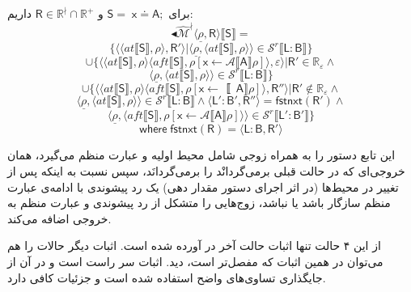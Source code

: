 برای $\mathsf{S=\;x \doteq A;}$ و $\mathsf{R} \in \mathbb{R^\nmid} \cap \mathbb{R^+}$ داریم:
$$\blacktriangleleft\mathcal{\hat{M}^\nmid} \langle \underline{\rho}, \mathsf{R} \rangle \llbracket \mathsf{S} \rrbracket
=$$
$$\{
\langle \langle at \llbracket \mathsf{S} \rrbracket, \rho \rangle , \mathsf{R'} \rangle |
\langle \underline{\rho}, \langle at \llbracket \mathsf{S} \rrbracket, \rho \rangle \rangle \in \mathcal{S}^r \llbracket \mathsf{L:B} \rrbracket \}$$
$$\cup \{ \langle \langle at \llbracket \mathsf{S} \rrbracket , \rho \rangle  \langle aft \llbracket \mathsf{S} \rrbracket, 
\rho [\mathsf{x}\leftarrow \mathcal{A}\llbracket \mathsf{A} \rrbracket \rho ]\rangle , \varepsilon \rangle | \mathsf{R'} \in \mathbb{R_\varepsilon} \land$$
$$
\langle \underline{\rho}, \langle at \llbracket \mathsf{S} \rrbracket , \rho \rangle \rangle \in 
\mathcal{S}^r \llbracket \mathsf{L:B} \rrbracket
\}$$
$$\cup \{
\langle \langle at \llbracket \mathsf{S} \rrbracket , \rho \rangle \langle aft \llbracket \mathsf{S} \rrbracket , \rho [\mathsf{x} \leftarrow \mathcal \llbracket \mathsf{A}\rrbracket \rho]\rangle, \mathsf{R''}\rangle | \mathsf{R'} \notin \mathbb{R_\varepsilon} \land$$
$$\langle \underline{\rho},\langle at \llbracket \mathsf{S} \rrbracket , \rho \rangle \rangle \in \mathcal{S}^r \llbracket \mathsf{L:B} \rrbracket \land \langle \mathsf{L':B',R''} \rangle = 
\mathsf{fstnxt(R') }\land$$
$$\langle \underline{\rho}, \langle aft \llbracket \mathsf{S} \rrbracket,\rho 
[\mathsf{x} \leftarrow \mathcal{A}\llbracket \mathsf{A} \rrbracket \rho]\rangle \rangle \in 
\mathcal{S}^r \llbracket \mathsf{L':B'} \rrbracket
\}$$
$$\mathsf{where \; fstnxt(R)=\langle L:B,R' \rangle}$$

این تابع دستور را به همراه زوجی شامل محیط اولیه و عبارت منظم می‌گیرد، همان خروجی‌ای که در حالت قبلی برمی‌گردانْد را برمی‌گردانَد، سپس نسبت به اینکه پس از تغییر در محیط‌ها (در اثر اجرای دستور مقدار دهی) یک رد پیشوندی با ادامه‌ی عبارت منظم سازگار باشد یا نباشد، زوج‌هایی را متشکل از رد پیشوندی و عبارت منظم به خروجی اضافه می‌کند.

از این ۴ حالت تنها اثبات حالت آخر در \cite{calcul} آورده شده است. اثبات دیگر حالات را هم می‌توان در همین اثبات که مفصل‌تر است، دید. اثبات سر راست است و در آن از جایگذاری تساوی‌های واضح استفاده شده است و جزئیات کافی دارد.

